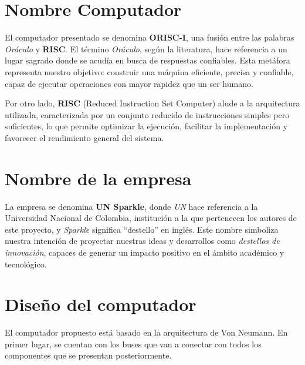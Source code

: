 \documentclass{article}
\begin{document}


\section{Nombre Computador}

El computador presentado se denomina \textbf{ORISC-I}, una fusión entre las
palabras \textit{Oráculo} y \textbf{RISC}. El término \textit{Oráculo}, según
la literatura, hace referencia a un lugar sagrado donde se acudía en busca de
respuestas confiables. Esta metáfora representa nuestro objetivo: construir una
máquina eficiente, precisa y confiable, capaz de ejecutar operaciones con mayor
rapidez que un ser humano.

Por otro lado, \textbf{RISC} (Reduced Instruction Set Computer) alude a la
arquitectura utilizada, caracterizada por un conjunto reducido de instrucciones
simples pero suficientes, lo que permite optimizar la ejecución, facilitar la
implementación y favorecer el rendimiento general del sistema.

\section{Nombre de la empresa}

La empresa se denomina \textbf{UN Sparkle}, donde \textit{UN} hace referencia a
la Universidad Nacional de Colombia, institución a la que pertenecen los autores
de este proyecto, y \textit{Sparkle} significa “destello” en inglés. Este nombre
simboliza nuestra intención de proyectar nuestras ideas y desarrollos como
\textit{destellos de innovación}, capaces de generar un impacto positivo en
el ámbito académico y tecnológico.


\section{Diseño del computador}

El computador propuesto está basado en la arquitectura de Von Neumann.
En primer lugar, se cuentan con los buses que van a conectar con todos los componentes
que se presentan posteriormente.
\end{document}
